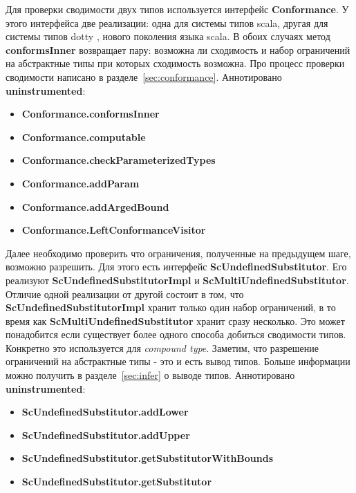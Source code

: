 Для проверки сводимости двух типов используется интерфейс \textbf{Conformance}.
У этого интерфейса две реализации: одна для системы типов scala, другая для
системы типов dotty \cite{dotty}, нового поколения языка scala.
В обоих случаях метод \textbf{conformsInner} возвращает пару: возможна ли
сходимость и набор ограничений на абстрактные типы при которых сходимость
возможна.
Про процесс проверки сводимости написано в разделе~\ref{sec:conformance}.
Аннотировано \textbf{uninstrumented}:
\begin{itemize}
  \item \textbf{Conformance.conformsInner}
  \item \textbf{Conformance.computable}
  \item \textbf{Conformance.checkParameterizedTypes}
  \item \textbf{Conformance.addParam}
  \item \textbf{Conformance.addArgedBound}
  \item \textbf{Conformance.LeftConformanceVisitor}
\end{itemize}

Далее необходимо проверить что ограничения, полученные на предыдущем шаге,
возможно разрешить.
Для этого есть интерфейс \textbf{ScUndefinedSubstitutor}.
Его реализуют \textbf{ScUndefinedSubstitutorImpl} и
\textbf{ScMultiUndefinedSubstitutor}.
Отличие одной реализации от другой состоит в том, что
\textbf{ScUndefinedSubstitutorImpl} хранит только один набор ограничений, в
то время как \textbf{ScMultiUndefinedSubstitutor} хранит сразу несколько.
Это может понадобится если существует более одного способа добиться сводимости
типов. Конкретно это используется для \textit{compound type}.
Заметим, что разрешение ограничений на абстрактные типы - это и есть вывод типов.
Больше информации можно получить в разделе~\ref{sec:infer} о выводе типов.
Аннотировано \textbf{uninstrumented}:
\begin{itemize}
  \item \textbf{ScUndefinedSubstitutor.addLower}
  \item \textbf{ScUndefinedSubstitutor.addUpper}
  \item \textbf{ScUndefinedSubstitutor.getSubstitutorWithBounds}
  \item \textbf{ScUndefinedSubstitutor.getSubstitutor}
\end{itemize}


